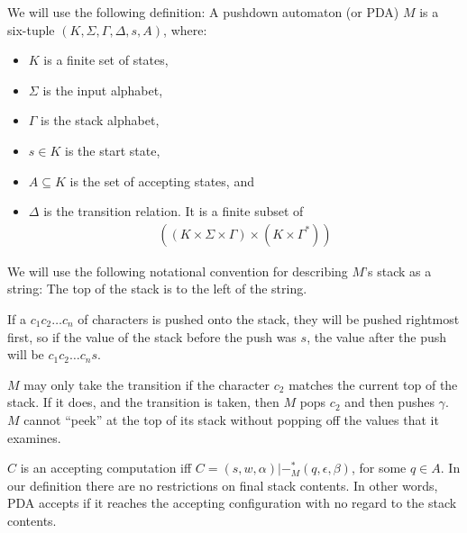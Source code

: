 \documentclass[hidelinks,12pt]{article}
\begin{document}
We will use the following definition: A pushdown automaton (or PDA) $M$ is a
six-tuple $(K, \Sigma, \Gamma, \Delta, s, A)$, where:
 
\begin{itemize}
    \item $K$ is a finite set of states, 
    \item $\Sigma$ is the input alphabet, 
    \item $\Gamma$ is the stack alphabet, 
    \item $s \in K$ is the start state, 
    \item $A \subseteq K$ is the set of accepting states, and 
    \item $\Delta$ is the transition relation.  It is a finite subset of  
        \begin{align*}
            \left(
            \left( K \times \Sigma \times \Gamma \right) \times \left( K \times \Gamma^*  \right)
            \right)
        \end{align*}
\end{itemize}

We will use the following notational convention for describing $M$’s stack as a
string: The top of the stack is to the left of the string.

If a $c_1c_2\ldots c_n$ of characters is pushed onto the stack, they
will be pushed rightmost first, so if the value of the stack before the push
was $s$, the value after the push will be $c_1c_2\ldots c_ns$.

$M$ may only take the transition if the character $c_2$ matches the current top
of the stack. If it does, and the transition is taken, then $M$ pops $c_2$ and
then pushes $\gamma$. $M$ cannot “peek” at the top of its stack without popping
off the values that it examines.

$C$ is an accepting computation iff $C = (s, w, \alpha)|-_{M}^{*}(q, \epsilon,
\beta)$, for some $q \in A$. In our definition there are no restrictions on
final stack contents. In other words, PDA accepts if it reaches the accepting
configuration with no regard to the stack contents.
\end{document}
